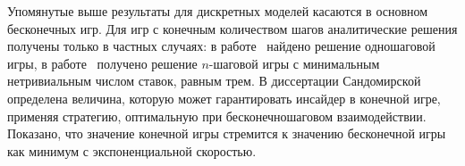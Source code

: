 Упомянутые выше результаты для дискретных моделей касаются в основном бесконечных игр.
Для игр с конечным количеством шагов аналитические решения получены только в частных случаях: в работе~\cite{sandomirskaya12} найдено решение одношаговой игры, в работе~\cite{kreps09} получено решение $n$-шаговой игры с минимальным нетривиальным числом ставок, равным трем.
В диссертации Сандомирской~\cite{phd:sandomirskaya} определена величина, которую может гарантировать инсайдер в конечной игре, применяя стратегию, оптимальную при бесконечношаговом взаимодействии.
Показано, что значение конечной игры стремится к значению бесконечной игры как минимум с экспоненциальной скоростью.

